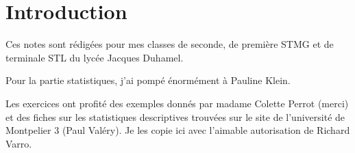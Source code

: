 
\section*{Introduction}

Ces notes sont rédigées pour mes classes de seconde, de première STMG et de terminale STL du lycée Jacques Duhamel.

Pour la partie statistiques, j'ai pompé énormément à Pauline Klein.

Les exercices ont profité des exemples donnés par madame Colette Perrot (merci) et des fiches \cite{qyKnLf} sur les statistiques descriptives trouvées sur le site de l'université de Montpelier 3 (Paul Valéry). Je les copie ici avec l'aimable autorisation de Richard Varro.

